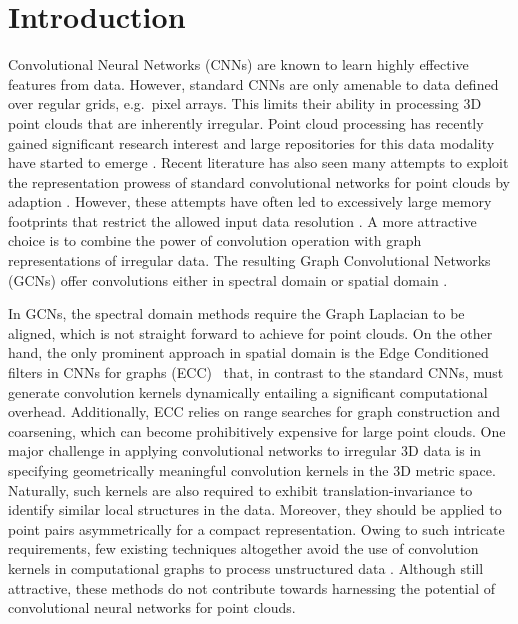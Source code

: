 \documentclass[10pt,twocolumn,letterpaper]{article}
\begin{document}
\section{Introduction}
\vspace{-2mm}
Convolutional Neural Networks (CNNs) \cite{lecun1998gradient} are known
to learn highly effective features from data.
However, standard CNNs are only amenable to data defined over regular grids, e.g.~pixel arrays. This  limits their ability in processing 3D point clouds that are inherently irregular. 
Point cloud processing has recently gained significant research interest and large repositories for this data modality have started to emerge \cite{armeni20163d, chang2015shapenet, hackel2017semantic3d, wu20153d, yi2016scalable}.
Recent literature has also seen many attempts to exploit the representation prowess of standard convolutional networks for point clouds by adaption \cite{maturana2015voxnet, wu20153d}.
However, these attempts have often led to excessively large memory footprints that restrict the allowed input data resolution \cite{riegler2017octnet, simonovsky2017dynamic}.
A more attractive choice is to combine the power of convolution operation  with graph representations of irregular data.
The resulting Graph Convolutional Networks (GCNs) offer convolutions either in  spectral domain  \cite{bruna2013spectral, defferrard2016convolutional,kipf2017semi} or  spatial domain \cite{simonovsky2017dynamic}.

In GCNs, the spectral domain methods require the Graph Laplacian to be aligned, which is not straight forward to achieve for point clouds. On the other hand, the only prominent approach in  spatial domain is the Edge Conditioned filters in CNNs for graphs (ECC)~\cite{simonovsky2017dynamic} that, in contrast to the standard CNNs, must generate convolution kernels dynamically entailing a significant computational overhead. Additionally, ECC relies on range searches for graph construction and coarsening, which can become prohibitively expensive for large point clouds. 
One major challenge in applying convolutional networks to irregular 3D data is in specifying geometrically meaningful convolution kernels in the 3D metric space.
Naturally, such kernels are also required to exhibit translation-invariance to identify similar local structures in the data. Moreover, they should be applied to point pairs asymmetrically for a compact representation.   
Owing to such intricate requirements, few existing techniques   altogether avoid the use of convolution kernels in computational graphs to process  unstructured data \cite{klokov2017escape, qi2017pointnet, qi2017pointnetplusplus}. Although still attractive, these methods do not contribute towards harnessing the potential of convolutional neural networks for point clouds. 
\end{document}

